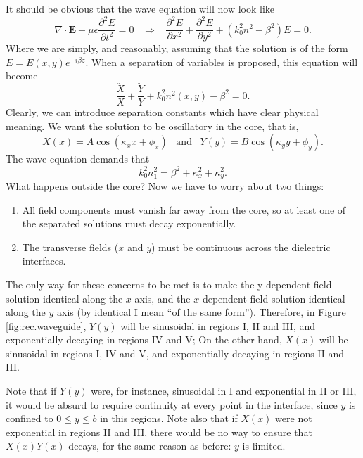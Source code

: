 It should be obvious that the wave equation will now look like
\begin{equation}
    \nabla\cdot\textbf{E}-\mu\epsilon\frac{\partial^2 E}{\partial t^2}=0\;\;\;\Rightarrow\;\;\;\frac{\partial^2 E}{\partial x^2}+\frac{\partial^2 E}{\partial y^2}+(k_0^2n^2-\beta^2)E=0.
\end{equation}
Where we are simply, and reasonably, assuming that the solution is of the form $E=E(x,y)e^{-i\beta z}$. When a separation of variables is proposed, this equation will become
\begin{equation}
    \frac{\ddot{X}}{X}+\frac{\ddot{Y}}{Y}+k_0^2n^2(x,y)-\beta^2=0.
\end{equation}
Clearly, we can introduce separation constants which have clear physical meaning. We want the solution to be oscillatory in the core, that is,
\begin{equation}
    X(x)=A\cos(\kappa_xx+\phi_x)\;\;\;\text{and}\;\;\;Y(y)=B\cos(\kappa_yy+\phi_y).
\end{equation}
The wave equation demands that
\begin{equation}
    \boxed{k_0^2n_1^2=\beta^2+\kappa_x^2+\kappa_y^2.}
\end{equation}
What happens outside the core? Now we have to worry about two things:
\begin{enumerate}
    \item All field components must vanish far away from the core, so at least one of the separated solutions must decay exponentially.
    \item The transverse fields ($x$ and $y$) must be continuous across the dielectric interfaces.
\end{enumerate}
The only way for these concerns to be met is to make the y dependent field solution identical along the $x$ axis, and the $x$ dependent field solution identical along the $y$ axis (by identical I mean ``of the same form''). Therefore, in Figure \ref{fig:rec.waveguide}, $Y(y)$ will be sinusoidal in regions I, II and III, and exponentially decaying in regions IV and V; On the other hand, $X(x)$ will be sinusoidal in regions I, IV and V, and exponentially decaying in regions II and III.

Note that if $Y(y)$ were, for instance, sinusoidal in I and exponential in II or III, it would be absurd to require continuity at every point in the interface, since $y$ is confined to $0\le y \le b$ in this regions. Note also that if $X(x)$ were not exponential in regions II and III, there would be no way to ensure that $X(x)Y(x)$ decays, for the same reason as before: $y$ is limited.

